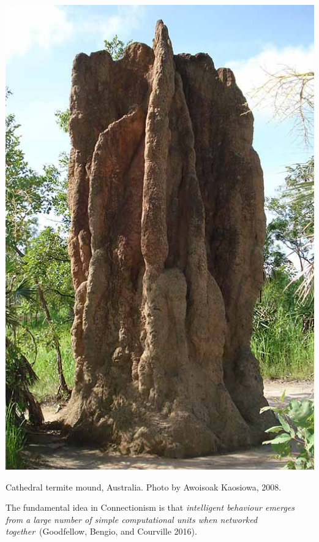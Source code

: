 \documentclass[
  letterpaper,
  12pt,
  british]{tufte-book}
\theoremstyle{plain}
\theoremstyle{definition}
\theoremstyle{plain}
\theoremstyle{remark}
\begin{document}
\begin{marginfigure}

{\centering \includegraphics{Images/termite_cathedral.jpg}

}

\caption{\label{fig-termite}Cathedral termite mound, Australia. Photo by
Awoisoak Kaosiowa, 2008.}

\end{marginfigure}

The fundamental idea in Connectionism is that \emph{intelligent
behaviour emerges from a large number of simple computational units when
networked together}~(Goodfellow, Bengio, and Courville
2016).
\end{document}
